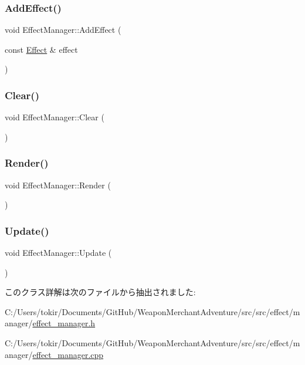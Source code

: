 \subsubsection{\texorpdfstring{Add\+Effect()}{AddEffect()}}
{\footnotesize\ttfamily void Effect\+Manager\+::\+Add\+Effect (\begin{DoxyParamCaption}\item[{const \mbox{\hyperlink{class_effect}{Effect}} \&}]{effect }\end{DoxyParamCaption})}

\mbox{\label{class_effect_manager_a4efa9673f06df792679389b3c909bbc9}} 
\subsubsection{\texorpdfstring{Clear()}{Clear()}}
{\footnotesize\ttfamily void Effect\+Manager\+::\+Clear (\begin{DoxyParamCaption}{ }\end{DoxyParamCaption})}

\mbox{\label{class_effect_manager_af5beef30ba12cb8c779b2c8d0ae55861}} 
\subsubsection{\texorpdfstring{Render()}{Render()}}
{\footnotesize\ttfamily void Effect\+Manager\+::\+Render (\begin{DoxyParamCaption}{ }\end{DoxyParamCaption})}

\mbox{\label{class_effect_manager_a966fbd56f3cf4763bc3a52fc5b8f4eff}} 
\subsubsection{\texorpdfstring{Update()}{Update()}}
{\footnotesize\ttfamily void Effect\+Manager\+::\+Update (\begin{DoxyParamCaption}{ }\end{DoxyParamCaption})}



このクラス詳解は次のファイルから抽出されました\+:\begin{DoxyCompactItemize}
\item 
C\+:/\+Users/tokir/\+Documents/\+Git\+Hub/\+Weapon\+Merchant\+Adventure/src/src/effect/manager/\mbox{\hyperlink{effect__manager_8h}{effect\+\_\+manager.\+h}}\item 
C\+:/\+Users/tokir/\+Documents/\+Git\+Hub/\+Weapon\+Merchant\+Adventure/src/src/effect/manager/\mbox{\hyperlink{effect__manager_8cpp}{effect\+\_\+manager.\+cpp}}\end{DoxyCompactItemize}
